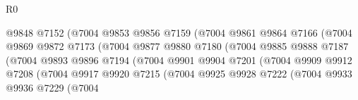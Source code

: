 \begin{lexlean}{R0}
\begin{coremodule}
                                      @9848
                                      @7152
                                      (@7004
                                        @9853
                                        @9856
                                        @7159
                                        (@7004
                                          @9861
                                          @9864
                                          @7166
                                          (@7004
                                            @9869
                                            @9872
                                            @7173
                                            (@7004
                                              @9877
                                              @9880
                                              @7180
                                              (@7004
                                                @9885
                                                @9888
                                                @7187
                                                (@7004
                                                  @9893
                                                  @9896
                                                  @7194
                                                  (@7004
                                                    @9901
                                                    @9904
                                                    @7201
                                                    (@7004
                                                      @9909
                                                      @9912
                                                      @7208
                                                      (@7004
                                                        @9917
                                                        @9920
                                                        @7215
                                                        (@7004
                                                          @9925
                                                          @9928
                                                          @7222
                                                          (@7004
                                                            @9933
                                                            @9936
                                                            @7229
                                                            (@7004

\end{coremodule}
\end{lexlean}
